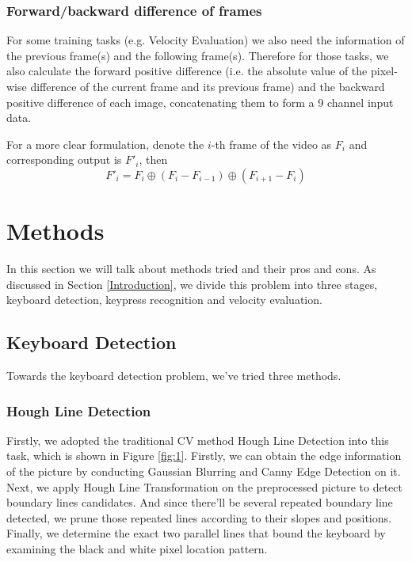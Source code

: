 \documentclass[10pt,twocolumn,letterpaper]{article}
\begin{document}
\subsubsection{Forward/backward difference of frames}

For some training tasks (e.g. Velocity Evaluation) we also need the information of the previous frame(s) and the following frame(s). 
Therefore for those tasks, we also calculate the forward positive difference (i.e. the absolute value of the pixel-wise difference of the current frame and its previous frame) and the backward positive difference of each image, concatenating them to form a 9 channel input data. 

For a more clear formulation, denote the $i$-th frame of the video as $F_i$ and corresponding output is $F'_i$, then 
$$F'_i = F_i\oplus(F_i-F_{i-1})\oplus(F_{i+1}-F_i)$$



\section{Methods}

In this section we will talk about methods tried and their pros and cons. 
As discussed in Section \ref{Introduction}, we divide this problem into three stages, keyboard detection, keypress recognition and velocity evaluation.

\subsection{Keyboard Detection}
\label{Keyboard}

Towards the keyboard detection problem, we've tried three methods. 

\subsubsection{Hough Line Detection}
Firstly, we adopted the traditional CV method Hough Line Detection into this task, which is shown in Figure \ref{fig:1}. 
Firstly, we can obtain the edge information of the picture by conducting Gaussian Blurring and Canny Edge Detection on it.
Next, we apply Hough Line Transformation \cite{Hough} on the preprocessed picture to detect boundary lines candidates. 
And since there'll be several repeated boundary line detected, we prune those repeated lines according to their slopes and positions.
Finally, we determine the exact two parallel lines that bound the keyboard by examining the black and white pixel location pattern. 
\end{document}
